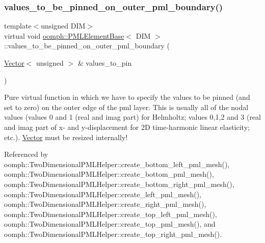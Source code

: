 \subsubsection{\texorpdfstring{values\+\_\+to\+\_\+be\+\_\+pinned\+\_\+on\+\_\+outer\+\_\+pml\+\_\+boundary()}{values\_to\_be\_pinned\_on\_outer\_pml\_boundary()}}
{\footnotesize\ttfamily template$<$unsigned D\+IM$>$ \\
virtual void \hyperlink{classoomph_1_1PMLElementBase}{oomph\+::\+P\+M\+L\+Element\+Base}$<$ D\+IM $>$\+::values\+\_\+to\+\_\+be\+\_\+pinned\+\_\+on\+\_\+outer\+\_\+pml\+\_\+boundary (\begin{DoxyParamCaption}\item[{\hyperlink{classoomph_1_1Vector}{Vector}$<$ unsigned $>$ \&}]{values\+\_\+to\+\_\+pin }\end{DoxyParamCaption})\hspace{0.3cm}{\ttfamily [pure virtual]}}



Pure virtual function in which we have to specify the values to be pinned (and set to zero) on the outer edge of the pml layer. This is usually all of the nodal values (values 0 and 1 (real and imag part) for Helmholtz; values 0,1,2 and 3 (real and imag part of x-\/ and y-\/displacement for 2D time-\/harmonic linear elasticity; etc.). \hyperlink{classoomph_1_1Vector}{Vector} must be resized internally! 



Referenced by oomph\+::\+Two\+Dimensional\+P\+M\+L\+Helper\+::create\+\_\+bottom\+\_\+left\+\_\+pml\+\_\+mesh(), oomph\+::\+Two\+Dimensional\+P\+M\+L\+Helper\+::create\+\_\+bottom\+\_\+pml\+\_\+mesh(), oomph\+::\+Two\+Dimensional\+P\+M\+L\+Helper\+::create\+\_\+bottom\+\_\+right\+\_\+pml\+\_\+mesh(), oomph\+::\+Two\+Dimensional\+P\+M\+L\+Helper\+::create\+\_\+left\+\_\+pml\+\_\+mesh(), oomph\+::\+Two\+Dimensional\+P\+M\+L\+Helper\+::create\+\_\+right\+\_\+pml\+\_\+mesh(), oomph\+::\+Two\+Dimensional\+P\+M\+L\+Helper\+::create\+\_\+top\+\_\+left\+\_\+pml\+\_\+mesh(), oomph\+::\+Two\+Dimensional\+P\+M\+L\+Helper\+::create\+\_\+top\+\_\+pml\+\_\+mesh(), and oomph\+::\+Two\+Dimensional\+P\+M\+L\+Helper\+::create\+\_\+top\+\_\+right\+\_\+pml\+\_\+mesh().

\mbox{\label{classoomph_1_1PMLElementBase_aa5b90942c96259fd87804d5967f0b2ee}} 
